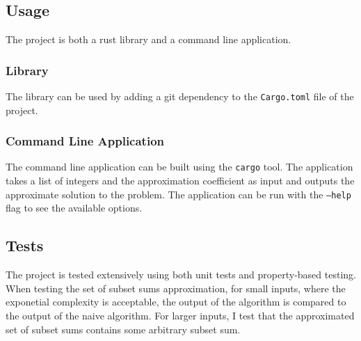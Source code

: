 \subsection{Usage}
The project is both a rust library and a command line application. 
\subsubsection{Library}
The library can be used by adding a git dependency to the \texttt{Cargo.toml} file of the project.
\subsubsection{Command Line Application}
The command line application can be built using the \texttt{cargo} tool. The application takes a list of integers and the approximation coefficient as input and outputs the approximate solution to the \Partition problem. The application can be run with the \texttt{--help} flag to see the available options.

\subsection{Tests}
The project is tested extensively using both unit tests and property-based testing. When testing the set of subset sums approximation, for small inputs, where the exponetial complexity is acceptable, the output of the algorithm is compared to the output of the naive algorithm. For larger inputs, I test that the approximated set of subset sums contains some arbitrary subset sum.

